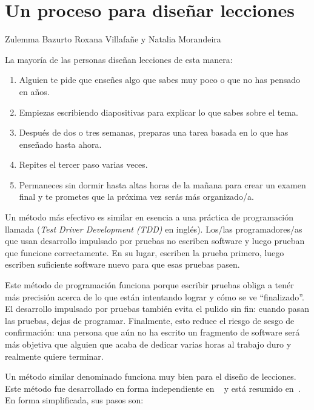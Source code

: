 \chapter{Un proceso para diseñar lecciones}\label{s:process}

\begin{reviewer}
{Zulemma Bazurto}
{Roxana Villafañe y	Natalia Morandeira}
\end{reviewer}

La mayoría de las personas diseñan lecciones de esta manera:
\begin{enumerate}

 \item
Alguien te pide que enseñes algo que sabes muy poco o que no has pensado en años.

 \item
Empiezas escribiendo diapositivas para explicar lo que sabes sobre el tema.

 \item
Después de dos o tres semanas,
preparas una tarea basada en lo que has enseñado hasta ahora.
 \item
Repites el tercer paso varias veces.
 \item
Permaneces sin dormir hasta altas horas de la mañana
para crear un examen final
y te prometes que la próxima vez serás más organizado/a.
\end{enumerate}

Un método más efectivo es similar en esencia a una práctica de programación 
llamada  (\emph{Test Driver Development (TDD)} en inglés).
Los/las programadores/as que usan desarrollo impulsado por pruebas no escriben software
y luego prueban que funcione correctamente.
En su lugar,
escriben la prueba primero,
luego escriben suficiente software nuevo para que esas pruebas pasen.
 
Este método de programación funciona porque escribir pruebas obliga a
tenér más precisión acerca de lo que están intentando lograr y cómo se ve ``finalizado''.
El desarrollo impulsado por pruebas también evita el pulido sin fin:
cuando pasan las pruebas, dejas de programar.
Finalmente,
esto reduce el riesgo de sesgo de confirmación:
una persona que aún no ha escrito un fragmento de software
será más objetiva que alguien que acaba de dedicar varias horas al trabajo duro y realmente quiere terminar.
 
Un método similar denominado  funciona muy bien para el diseño de lecciones.
Este método fue desarrollado en forma independiente en ~\cite{Wigg2005,Bigg2011,Fink2013} y está resumido en~\cite{McTi2013}.
En forma simplificada, sus pasos son:
 
